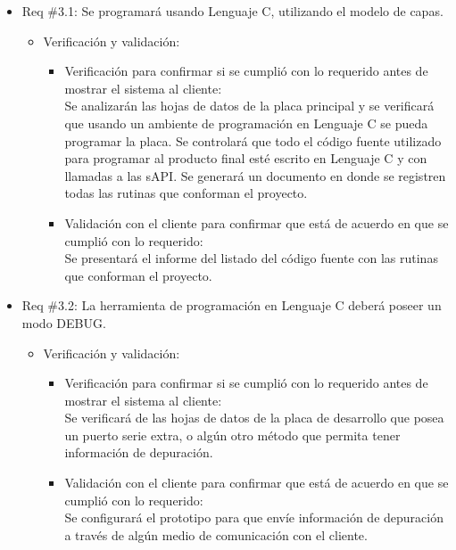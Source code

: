 \documentclass[
11pt, %
codirector, %
]{charter}
\begin{document}
\begin{itemize}
\item Req \#3.1: Se programará usando Lenguaje C, utilizando el modelo de capas.
\begin{itemize}
\item Verificación y validación:
	\begin{itemize}
	\item Verificación para confirmar si se cumplió con lo requerido 	antes de mostrar el sistema al cliente:\\
	Se analizarán las hojas de datos de la placa principal  y se
	verificará que usando un ambiente de programación en Lenguaje C
	se pueda programar la placa. Se controlará que todo el código
	fuente utilizado para programar al producto final esté escrito
	en Lenguaje C y con llamadas a las sAPI.
	Se generará un documento en donde se registren todas las rutinas
	que conforman el proyecto. 
	\item Validación con el cliente para confirmar que está de 				acuerdo en que se cumplió con lo requerido:\\
	Se presentará el informe del listado del código fuente con las
	rutinas que conforman el proyecto.   
	\end{itemize}
\end{itemize}
\end{itemize}

\begin{itemize}
\item Req \#3.2: La herramienta de programación en Lenguaje C deberá poseer un modo DEBUG.
\begin{itemize}
\item Verificación y validación:
	\begin{itemize}
	\item Verificación para confirmar si se cumplió con lo requerido 	antes de mostrar el sistema al cliente:\\
	Se verificará de las hojas de datos de la placa de desarrollo
	que posea un puerto serie extra, o algún otro método que permita tener información de depuración. 
	\item Validación con el cliente para confirmar que está de 				acuerdo en que se cumplió con lo requerido:\\
	Se configurará el prototipo para que envíe información de depuración a través de algún medio de comunicación con el cliente.
	\end{itemize}
\end{itemize}
\end{itemize}
\end{document}
